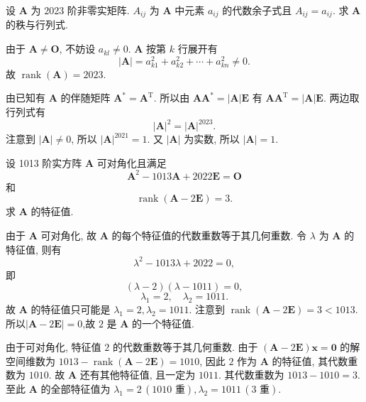 \documentclass[../../main.tex]{subfiles}%
\begin{document}
\begin{example}
设 \(\boldsymbol{A}\) 为 2023 阶非零实矩阵. \(A_{ij}\) 为 \(\boldsymbol{A}\) 中元素 \(a_{ij}\) 的代数余子式且 \(A_{ij} = a_{ij}\). 求 \(\boldsymbol{A}\) 的秩与行列式.
\end{example}
\begin{solution}
由于 \(\boldsymbol{A} \neq \boldsymbol{O}\), 不妨设 \(a_{kl} \neq 0\). \(\boldsymbol{A}\) 按第 \(k\) 行展开有
\[
|\boldsymbol{A}| = a_{k1}^2 + a_{k2}^2 + \cdots + a_{kn}^2 \neq 0.
\]
故 \(\operatorname{rank}(\boldsymbol{A}) = 2023\).

由已知有 \(\boldsymbol{A}\) 的伴随矩阵 \(\boldsymbol{A}^* = \boldsymbol{A}^\mathrm{T}\). 所以由 \(\boldsymbol{A}\boldsymbol{A}^* = |\boldsymbol{A}|\boldsymbol{E}\) 有 \(\boldsymbol{A}\boldsymbol{A}^\mathrm{T} = |\boldsymbol{A}|\boldsymbol{E}\). 两边取行列式有
\[
|\boldsymbol{A}|^2 = |\boldsymbol{A}|^{2023}.
\]
注意到 \(|\boldsymbol{A}| \neq 0\), 所以 \(|\boldsymbol{A}|^{2021} = 1\). 又 \(|\boldsymbol{A}|\) 为实数, 所以 \(|\boldsymbol{A}| = 1\).

\end{solution}

\begin{example}
设 1013 阶实方阵 \(\boldsymbol{A}\) 可对角化且满足
\[
\boldsymbol{A}^2 - 1013\boldsymbol{A} + 2022\boldsymbol{E} = \boldsymbol{O}
\]
和
\[
\operatorname{rank}(\boldsymbol{A} - 2\boldsymbol{E}) = 3.
\]
求 \(\boldsymbol{A}\) 的特征值.
\end{example}
\begin{solution}
由于 \(\boldsymbol{A}\) 可对角化, 故 \(\boldsymbol{A}\) 的每个特征值的代数重数等于其几何重数. 令 \(\lambda\) 为 \(\boldsymbol{A}\) 的特征值, 则有
\[
\lambda^2 - 1013\lambda + 2022 = 0,
\]
即
\[
(\lambda - 2)(\lambda - 1011) = 0,
\]
\[
\lambda_1 = 2, \quad \lambda_2 = 1011.
\]
故 \(\boldsymbol{A}\) 的特征值只可能是 \(\lambda_1 = 2, \lambda_2 = 1011\). 注意到 \(\operatorname{rank}(\boldsymbol{A} - 2\boldsymbol{E}) = 3 < 1013\). 所以$|\boldsymbol{A} - 2\boldsymbol{E}|=0$,故 \(2\) 是 \(\boldsymbol{A}\) 的一个特征值.

由于可对角化, 特征值 \(2\) 的代数重数等于其几何重数. 由于 \((\boldsymbol{A} - 2\boldsymbol{E})\boldsymbol{x} = \boldsymbol{0}\) 的解空间维数为 \(1013 - \operatorname{rank}(\boldsymbol{A} - 2\boldsymbol{E}) = 1010\), 因此 \(2\) 作为 \(\boldsymbol{A}\) 的特征值, 其代数重数为 \(1010\). 故 \(\boldsymbol{A}\) 还有其他特征值, 且一定为 \(1011\). 其代数重数为 \(1013 - 1010 = 3\). 至此 \(\boldsymbol{A}\) 的全部特征值为 \(\lambda_1 = 2 \, (1010 \text{ 重}), \lambda_2 = 1011 \, (3 \text{ 重})\).

\end{solution}
\end{document}
